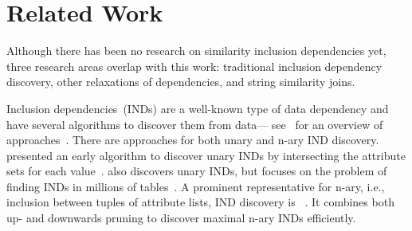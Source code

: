 \section{Related Work}
\label{section:related_work2}

Although there has been no research on similarity inclusion dependencies yet, three research areas overlap with this work: traditional inclusion dependency discovery, other relaxations of dependencies, and string similarity joins.

Inclusion dependencies~(INDs) are a well-known type of data dependency and have several algorithms to discover them from data--- see~\citeauthor{dursch2019eval} for an overview of approaches~\cite{dursch2019eval}.
There are approaches for both unary and n-ary IND discovery.
\citeauthor{deMarchiIND} presented an early algorithm to discover unary INDs by intersecting the attribute sets for each value~\cite{deMarchiIND}.
 also discovers unary INDs, but focuses on the problem of finding INDs in millions of tables~\cite{Tschirschnitz2017MANY}.
A prominent representative for n-ary, i.e., inclusion between tuples of attribute lists, IND discovery is ~\cite{deMarchi2003ZIGZAG}.
It combines both up- and downwards pruning to discover maximal n-ary INDs efficiently.


